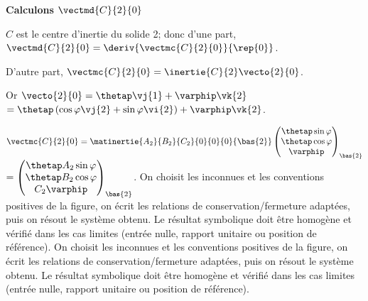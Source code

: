 \begin{corrigebox}
\vspace{.5cm}

\textbf{Calculons $\vectmd{C}{2}{0}$}

$C$ est le centre d'inertie du solide 2; donc 
d'une part, $\vectmd{C}{2}{0} = \deriv{\vectmc{C}{2}{0} }{\rep{0}}$.

 D'autre part, $\vectmc{C}{2}{0} = \inertie{C}{2}\vecto{2}{0}$. 
 
 Or $\vecto{2}{0} = \thetap \vj{1} + \varphip\vk{2}$ $= \thetap \left(\cos\varphi \vj{2} + \sin\varphi \vi{2}\right) + \varphip\vk{2}$.
 
$\vectmc{C}{2}{0} = \matinertie{A_2}{B_2}{C_2}{0}{0}{0}{\bas{2}} 
 \begin{pmatrix} 
 \thetap \sin\varphi  \\
  \thetap \cos\varphi  \\
  \varphip
 \end{pmatrix}_{\bas{2}}$
 $ =  \begin{pmatrix} 
 \thetap A_2 \sin\varphi  \\
  \thetap B_2 \cos\varphi  \\
  C_ 2 \varphip
 \end{pmatrix}_{\bas{2}}$.
On choisit les inconnues et les conventions positives de la figure,
        on écrit les relations de conservation/fermeture adaptées, puis on résout le
        système obtenu. Le résultat symbolique doit être homogène et vérifié dans les cas
        limites (entrée nulle, rapport unitaire ou position de référence).
On choisit les inconnues et les conventions positives de la figure,
        on écrit les relations de conservation/fermeture adaptées, puis on résout le
        système obtenu. Le résultat symbolique doit être homogène et vérifié dans les cas
        limites (entrée nulle, rapport unitaire ou position de référence).
\end{corrigebox}

